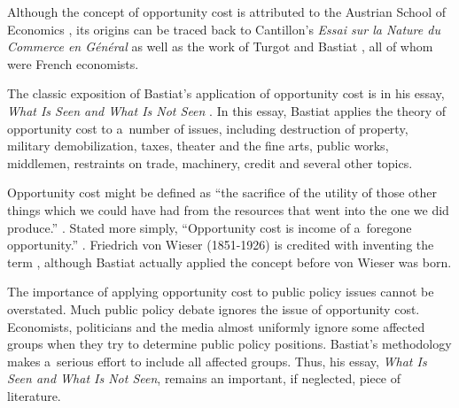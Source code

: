 Although the concept of opportunity cost is attributed to the Austrian School of Economics 
\parencites[][p.14]{}[][p.895]{haney_history_1949}[][p.917]{schumpeter_history_1954}, %
 its origins can be traced back to Cantillon's \textit{Essai sur la Nature du Commerce en Général} 
\parencite*[][]{} %
 as well as the work of Turgot 
\parencites[][p.391]{rothbard_economic_1995}[][pp.34]{} %
 and Bastiat 
\parencite[][pp.62–63]{holcombe_frederic_1999}, %
 all of whom were French economists.



The classic exposition of Bastiat's application of opportunity cost is in his essay, \textit{What Is Seen and What Is Not Seen} 
\parencites[][]{bastiat_ce_1850}[][pp.1–50]{bastiat_selected_1964}[][]{}. %
 In this essay, Bastiat applies the theory of opportunity cost to a~number of issues, including destruction of property, military demobilization, taxes, theater and the fine arts, public works, middlemen, restraints on trade, machinery, credit and several other topics.



Opportunity cost might be defined as ``the sacrifice of the utility of those other things which we could have had from the resources that went into the one we did produce.'' 
\parencite[][p.917]{schumpeter_history_1954}. %
 Stated more simply, ``Opportunity cost is income of a~foregone opportunity.'' 
\parencite[][]{magni_splitting_2009}. %
 Friedrich von Wieser (1851-1926) is credited with inventing the term 
\parencite[][p.184]{skousen_making_2001}, %
 although Bastiat actually applied the concept before von Wieser was born.



The importance of applying opportunity cost to public policy issues cannot be overstated. Much public policy debate ignores the issue of opportunity cost. Economists, politicians and the media almost uniformly ignore some affected groups when they try to determine public policy positions. Bastiat's methodology makes a~serious effort to include all affected groups. Thus, his essay, \textit{What Is Seen and What Is Not Seen}, remains an important, if neglected, piece of literature.



